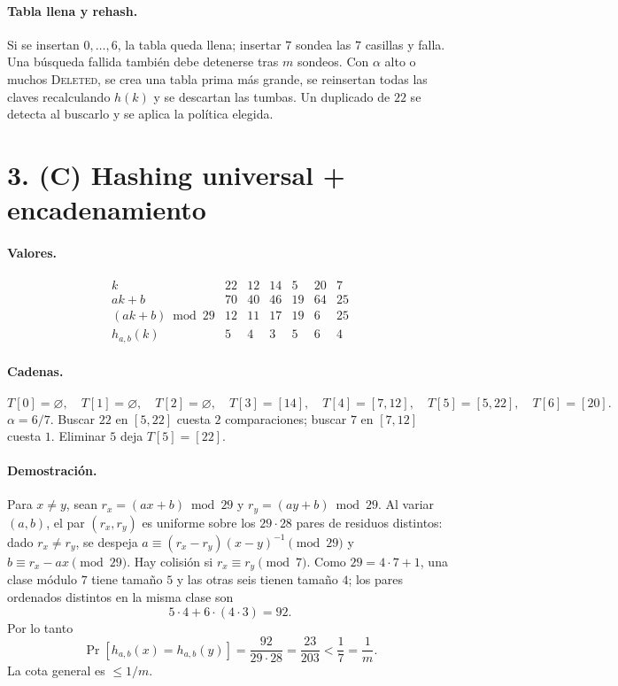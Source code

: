 \documentclass[11pt]{article}
\begin{document}
\paragraph{Tabla llena y rehash.}
Si se insertan \(0,\dots,6\), la tabla queda llena; insertar \(7\) sondea las \(7\) casillas y falla. Una búsqueda fallida también debe detenerse tras \(m\) sondeos. Con \(\alpha\) alto o muchos \textsc{Deleted}, se crea una tabla prima más grande, se reinsertan todas las claves recalculando \(h(k)\) y se descartan las tumbas. Un duplicado de \(22\) se detecta al buscarlo y se aplica la política elegida.

\section*{3. (C) Hashing universal + encadenamiento}

\paragraph{Valores.}
\[
\begin{array}{c|cccccc}
k & 22 & 12 & 14 & 5 & 20 & 7\\ \hline
ak+b & 70 & 40 & 46 & 19 & 64 & 25\\
(ak+b)\bmod 29 & 12 & 11 & 17 & 19 & 6 & 25\\
h_{a,b}(k) & 5 & 4 & 3 & 5 & 6 & 4
\end{array}
\]

\paragraph{Cadenas.}
\[
T[0]=\varnothing,\quad T[1]=\varnothing,\quad T[2]=\varnothing,\quad T[3]=[14],\quad T[4]=[7,12],\quad T[5]=[5,22],\quad T[6]=[20].
\]
\(\alpha=6/7\). Buscar \(22\) en \([5,22]\) cuesta \(2\) comparaciones; buscar \(7\) en \([7,12]\) cuesta \(1\). Eliminar \(5\) deja \(T[5]=[22]\).

\paragraph{Demostración.}
Para \(x\neq y\), sean \(r_x=(ax+b)\bmod 29\) y \(r_y=(ay+b)\bmod 29\). Al variar \((a,b)\), el par \((r_x,r_y)\) es uniforme sobre los \(29\cdot28\) pares de residuos distintos: dado \(r_x\neq r_y\), se despeja \(a\equiv(r_x-r_y)(x-y)^{-1}\pmod{29}\) y \(b\equiv r_x-ax\pmod{29}\). Hay colisión si \(r_x\equiv r_y\pmod 7\). Como \(29=4\cdot7+1\), una clase módulo \(7\) tiene tamaño \(5\) y las otras seis tienen tamaño \(4\); los pares ordenados distintos en la misma clase son
\[
5\cdot4+6\cdot(4\cdot3)=92.
\]
Por lo tanto
\[
\Pr[h_{a,b}(x)=h_{a,b}(y)]=\frac{92}{29\cdot28}=\frac{23}{203}<\frac17=\frac1m.
\]
La cota general es \(\le1/m\).
\end{document}
